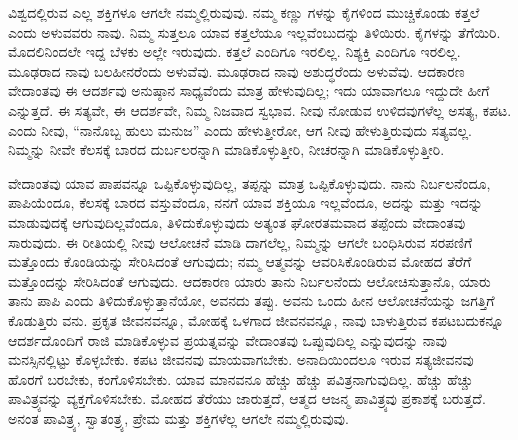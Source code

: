 ವಿಶ್ವದಲ್ಲಿರುವ ಎಲ್ಲ ಶಕ್ತಿಗಳೂ ಆಗಲೇ ನಮ್ಮಲ್ಲಿರುವುವು. ನಮ್ಮ ಕಣ್ಣು ಗಳನ್ನು ಕೈಗಳಿಂದ ಮುಚ್ಚಿಕೊಂಡು ಕತ್ತಲೆ ಎಂದು ಅಳುವವರು ನಾವು. ನಿಮ್ಮ ಸುತ್ತಲೂ ಯಾವ ಕತ್ತಲೆಯೂ ಇಲ್ಲವೆಂಬುದನ್ನು ತಿಳಿಯಿರು. ಕೈಗಳನ್ನು ತೆಗೆಯಿರಿ. ಮೊದಲಿನಿಂದಲೇ ಇದ್ದ ಬೆಳಕು ಅಲ್ಲೇ ಇರುವುದು. ಕತ್ತಲೆ ಎಂದಿಗೂ ಇರಲಿಲ್ಲ. ನಿಶ್ಯಕ್ತಿ ಎಂದಿಗೂ ಇರಲಿಲ್ಲ. ಮೂಢರಾದ ನಾವು ಬಲಹೀನರೆಂದು ಅಳುವೆವು. ಮೂಢರಾದ ನಾವು ಅಶುದ್ಧರೆಂದು ಅಳುವೆವು. ಆದಕಾರಣ ವೇದಾಂತವು ಈ ಆದರ್ಶವು ಅನುಷ್ಠಾನ ಸಾಧ್ಯವೆಂದು ಮಾತ್ರ ಹೇಳುವುದಿಲ್ಲ; ಇದು ಯಾವಾಗಲೂ ಇದ್ದುದೇ ಹೀಗೆ ಎನ್ನುತ್ತದೆ. ಈ ಸತ್ಯವೇ, ಈ ಆದರ್ಶವೇ, ನಿಮ್ಮ ನಿಜವಾದ ಸ್ವಭಾವ. ನೀವು ನೋಡುವ ಉಳಿದವುಗಳೆಲ್ಲ ಅಸತ್ಯ, ಕಪಟ. ಎಂದು ನೀವು, “ನಾನೊಬ್ಬ ಹುಲು ಮನುಜ” ಎಂದು ಹೇಳುತ್ತೀರೋ, ಆಗ ನೀವು ಹೇಳುತ್ತಿರುವುದು ಸತ್ಯವಲ್ಲ. ನಿಮ್ಮನ್ನು ನೀವೇ ಕೆಲಸಕ್ಕೆ ಬಾರದ ದುರ್ಬಲರನ್ನಾಗಿ ಮಾಡಿಕೊಳ್ಳುತ್ತೀರಿ, ನೀಚರನ್ನಾಗಿ ಮಾಡಿಕೊಳ್ಳುತ್ತೀರಿ.

ವೇದಾಂತವು ಯಾವ ಪಾಪವನ್ನೂ ಒಪ್ಪಿಕೊಳ್ಳುವುದಿಲ್ಲ, ತಪ್ಪನ್ನು ಮಾತ್ರ ಒಪ್ಪಿಕೊಳ್ಳುವುದು. ನಾನು ನಿರ್ಬಲನೆಂದೂ, ಪಾಪಿಯೆಂದೂ, ಕೆಲಸಕ್ಕೆ ಬಾರದ ವಸ್ತುವೆಂದೂ, ನನಗೆ ಯಾವ ಶಕ್ತಿಯೂ ಇಲ್ಲವೆಂದೂ, ಅದನ್ನು ಮತ್ತು ಇದನ್ನು ಮಾಡುವುದಕ್ಕೆ ಆಗುವುದಿಲ್ಲವೆಂದೂ, ತಿಳಿದುಕೊಳ್ಳುವುದು ಅತ್ಯಂತ ಘೋರತಮವಾದ ತಪ್ಪೆಂದು ವೇದಾಂತವು ಸಾರುವುದು. ಈ ರೀತಿಯಲ್ಲಿ ನೀವು ಆಲೋಚನೆ ಮಾಡಿ ದಾಗಲೆಲ್ಲ, ನಿಮ್ಮನ್ನು ಆಗಲೇ ಬಂಧಿಸಿರುವ ಸರಪಣಿಗೆ ಮತ್ತೊಂದು ಕೊಂಡಿಯನ್ನು ಸೇರಿಸಿದಂತೆ ಆಗುವುದು; ನಮ್ಮ ಆತ್ಮವನ್ನು ಆವರಿಸಿಕೊಂಡಿರುವ ಮೋಹದ ತೆರೆಗೆ ಮತ್ತೊಂದನ್ನು ಸೇರಿಸಿದಂತೆ ಆಗುವುದು. ಆದಕಾರಣ ಯಾರು ತಾನು ನಿರ್ಬಲನೆಂದು ಆಲೋಚಿಸುತ್ತಾನೊ, ಯಾರು ತಾನು ಪಾಪಿ ಎಂದು ತಿಳಿದುಕೊಳ್ಳುತ್ತಾನೆಯೋ, ಅವನದು ತಪ್ಪು. ಅವನು ಒಂದು ಹೀನ ಆಲೋಚನೆಯನ್ನು ಜಗತ್ತಿಗೆ ಕೊಡುತ್ತಿರು ವನು. ಪ್ರಕೃತ ಜೀವನವನ್ನೂ, ಮೋಹಕ್ಕೆ ಒಳಗಾದ ಜೀವನವನ್ನೂ, ನಾವು ಬಾಳುತ್ತಿರುವ ಕಪಟಬದುಕನ್ನೂ ಆದರ್ಶದೊಂದಿಗೆ ರಾಜಿ ಮಾಡಿಕೊಳ್ಳುವ ಪ್ರಯತ್ನವನ್ನು ವೇದಾಂತವು ಒಪ್ಪುವುದಿಲ್ಲ ಎನ್ನುವುದನ್ನು ನಾವು ಮನಸ್ಸಿನಲ್ಲಿಟ್ಟು ಕೊಳ್ಳಬೇಕು. ಕಪಟ ಜೀವನವು ಮಾಯವಾಗಬೇಕು. ಅನಾದಿಯಿಂದಲೂ ಇರುವ ಸತ್ಯಜೀವನವು ಹೊರಗೆ ಬರಬೇಕು, ಕಂಗೊಳಿಸಬೇಕು. ಯಾವ ಮಾನವನೂ ಹೆಚ್ಚು ಹೆಚ್ಚು ಪವಿತ್ರನಾಗುವುದಿಲ್ಲ. ಹೆಚ್ಚು ಹೆಚ್ಚು ಪಾವಿತ್ರ್ಯವನ್ನು ವ್ಯಕ್ತಗೊಳಿಸಬೇಕು. ಮೋಹದ ತೆರೆಯು ಜಾರುತ್ತದೆ, ಆತ್ಮದ ಆಜನ್ಮ ಪಾವಿತ್ರ್ಯವು ಪ್ರಕಾಶಕ್ಕೆ ಬರುತ್ತದೆ. ಅನಂತ ಪಾವಿತ್ರ್ಯ, ಸ್ವಾತಂತ್ರ್ಯ, ಪ್ರೇಮ ಮತ್ತು ಶಕ್ತಿಗಳೆಲ್ಲ ಆಗಲೇ ನಮ್ಮಲ್ಲಿರುವುವು.

